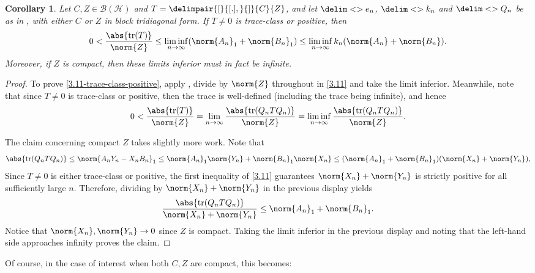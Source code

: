 \documentclass[10pt,reqno]{amsart}
\newtheorem{corollary}[theorem]{Corollary}
\theoremstyle{remark}
\newcommand{\BH}{\mathcal{B}(\Hil)}
\newcommand{\Hil}{\mathcal{H}}
\DeclareMathOperator{\trace}{tr}
\newcommand{\seq}{\delim<>}
\newcommand{\comm}{\delimpair{[}{[.],}{]}}
\numberwithin{equation}{section}
\begin{document}
\begin{corollary}
  Let $C,Z \in \BH$ and $T = \comm{C}{Z}$, and let $\seq{e_n}$, $\seq{k_n}$ and $\seq{Q_n}$ be as in , with either $C$ or $Z$ in block tridiagonal form.
  If $T \neq 0$ is trace-class or positive, then
  \begin{equation}
    \label{3.11-trace-class-positive}
    0 < \frac{\abs{\trace(T)}}{\norm{Z}} \le \liminf_{n \to \infty} (\norm{A_n}_1 + \norm{B_n}_1) \le \liminf_{n \to \infty} k_n(\norm{A_n} + \norm{B_n}).
  \end{equation}
  Moreover, if $Z$ is compact, then these limits inferior must in fact be infinite.
\end{corollary}

\begin{proof}
  To prove \eqref{3.11-trace-class-positive}, apply , divide by $\norm{Z}$ throughout in \eqref{3.11} and take the limit inferior.
  Meanwhile, note that since $T \neq 0$ is trace-class or positive, then the trace is well-defined (including the trace being infinite), and hence
  \begin{equation*}
    0 < \frac{\abs{\trace(T)}}{\norm{Z}} = \lim_{n \to \infty} \frac{\abs{\trace(Q_n T Q_n)}}{\norm{Z}} = \liminf_{n \to \infty} \frac{\abs{\trace(Q_n T Q_n)}}{\norm{Z}}.
  \end{equation*}

  The claim concerning compact $Z$ takes slightly more work.
  Note that
  \begin{equation*}
    \abs{\trace(Q_nTQ_n)} \le \norm{A_n Y_n - X_n B_n}_1 \le \norm{A_n}_1 \norm{Y_n} + \norm{B_n}_1 \norm{X_n} \le (\norm{A_n}_1 + \norm{B_n}_1)(\norm{X_n} + \norm{Y_n}),
  \end{equation*}
  Since $T \neq 0$ is either trace-class or positive, the first inequality of \eqref{3.11} guarantees $\norm{X_n} + \norm{Y_n}$ is strictly positive for all sufficiently large $n$.
  Therefore, 
  dividing by $\norm{X_n} + \norm{Y_n}$ in the previous display yields
  \begin{equation*}
    \frac{\abs{\trace(Q_n T Q_n)}}{\norm{X_n} + \norm{Y_n}} \le \norm{A_n}_1 + \norm{B_n}_1.
  \end{equation*}
  Notice that $\norm{X_n},\norm{Y_n} \to 0$ since $Z$ is compact.
  Taking the limit inferior in the previous display and noting that the left-hand side approaches infinity proves the claim.
\end{proof}

Of course, in the case of interest when both $C,Z$ are compact, this becomes:
\end{document}
